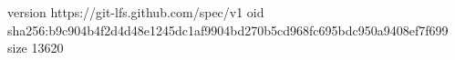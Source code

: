 version https://git-lfs.github.com/spec/v1
oid sha256:b9c904b4f2d4d48e1245dc1af9904bd270b5cd968fc695bdc950a9408ef7f699
size 13620
